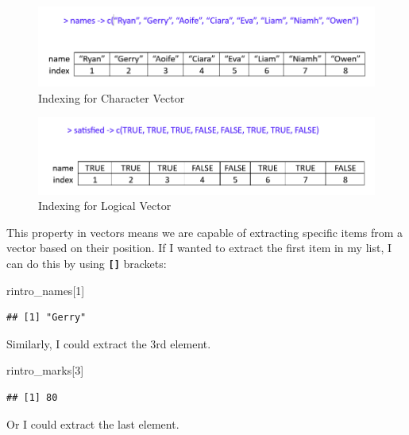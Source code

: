 \documentclass[
]{book}
\newenvironment{Shaded}{\begin{snugshade}}{\end{snugshade}}
\newcommand{\DecValTok}[1]{\textcolor[rgb]{0.00,0.00,0.81}{#1}}
\newcommand{\NormalTok}[1]{#1}
\begin{document}
\begin{figure}
\centering
\includegraphics{img/03-index-character.png}
\caption{\label{fig:unnamed-chunk-68}Indexing for Character Vector}
\end{figure}

\begin{figure}
\centering
\includegraphics{img/03-index-logical.png}
\caption{\label{fig:unnamed-chunk-69}Indexing for Logical Vector}
\end{figure}

This property in vectors means we are capable of extracting specific items from a vector based on their position. If I wanted to extract the first item in my list, I can do this by using \textbf{\texttt{{[}{]}}} brackets:

\begin{Shaded}
\begin{Highlighting}[]
\NormalTok{rintro\_names[}\DecValTok{1}\NormalTok{]}
\end{Highlighting}
\end{Shaded}

\begin{verbatim}
## [1] "Gerry"
\end{verbatim}

Similarly, I could extract the 3rd element.

\begin{Shaded}
\begin{Highlighting}[]
\NormalTok{rintro\_marks[}\DecValTok{3}\NormalTok{]}
\end{Highlighting}
\end{Shaded}

\begin{verbatim}
## [1] 80
\end{verbatim}

Or I could extract the last element.
\end{document}
